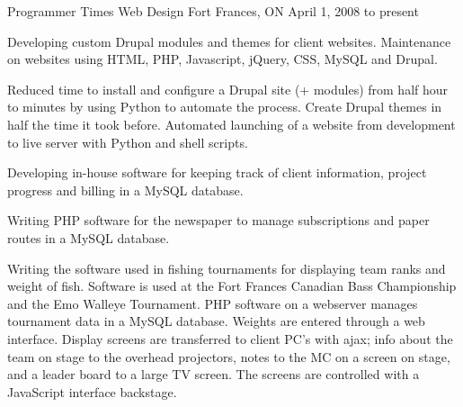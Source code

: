\documentclass[11pt, letterpaper]{awesome-cv}
\begin{document}
  \begin{cventries}

    \cventry
        {Programmer} %
        {Times Web Design} %
        {Fort Frances, ON} %
        {April 1, 2008 to present} %
        {
          \begin{cvitems} %
          \item {Developing custom Drupal modules and themes for client websites. Maintenance on websites using HTML, PHP, Javascript, jQuery, CSS, MySQL and Drupal.}
          \item {Reduced time to install and configure a Drupal site (+ 
            modules) from half hour to minutes by using Python to automate the 
            process. Create Drupal themes in half the time it took 
            before. Automated launching of a website from development to live 
            server with Python and shell scripts.}
          \item {Developing in-house software for keeping track of client
            information, project progress and billing in a MySQL database.}
          \item {Writing PHP software for the newspaper to manage subscriptions
            and paper routes in a MySQL database.}
          \item {Writing the software used in fishing tournaments for displaying
            team ranks and weight of fish. Software is used at the Fort Frances
            Canadian Bass Championship and the Emo Walleye Tournament.
            PHP software on a webserver manages tournament data in a MySQL
            database. Weights are entered through a web interface. Display
            screens are transferred to client PC's with ajax; info about the
            team on stage to the overhead projectors, notes to the MC on a
            screen on stage, and a leader board to a large TV screen. The
            screens are controlled with a JavaScript interface backstage.}
          \end{cvitems}
        }


\end{cventries}
\end{document}
